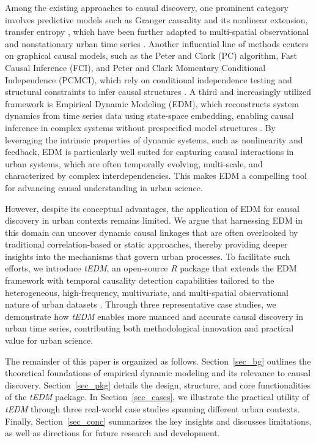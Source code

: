 \documentclass[authoryear,preprint,review,12pt]{elsarticle}
\begin{document}
Among the existing approaches to causal discovery, one prominent category involves predictive models such as Granger causality \citep{granger1969grangertest,geweke1982grangertest2} and its nonlinear extension, transfer entropy \citep{schreiber2000te1,vicente2010te2}, which have been further adapted to multi-spatial observational and nonstationary urban time series \citep{deng2022urban_granger_causality,gan2025urban_transfer_entropy}. Another influential line of methods centers on graphical causal models, such as the Peter and Clark (PC) algorithm, Fast Causal Inference (FCI), and Peter and Clark Momentary Conditional Independence (PCMCI), which rely on conditional independence testing and structural constraints to infer causal structures \citep{spirtes1993pc,runge2019pcmci,runge2023cits}. A third and increasingly utilized framework is Empirical Dynamic Modeling (EDM), which reconstructs system dynamics from time series data using state-space embedding, enabling causal inference in complex systems without prespecified model structures \citep{lorenz1969ssr,Takens1981embedding,Mane1981embedding,sugihara2012ccm}. By leveraging the intrinsic properties of dynamic systems, such as nonlinearity and feedback, EDM is particularly well suited for capturing causal interactions in urban systems, which are often temporally evolving, multi-scale, and characterized by complex interdependencies. This makes EDM a compelling tool for advancing causal understanding in urban science.

However, despite its conceptual advantages, the application of EDM for causal discovery in urban contexts remains limited. We argue that harnessing EDM in this domain can uncover dynamic causal linkages that are often overlooked by traditional correlation-based or static approaches, thereby providing deeper insights into the mechanisms that govern urban processes. To facilitate such efforts, we introduce \textit{tEDM}, an open-source \textit{R} package that extends the EDM framework with temporal causality detection capabilities tailored to the heterogeneous, high-frequency, multivariate, and multi-spatial observational nature of urban datasets \citep{deng2022urban_granger_causality,gan2025urban_transfer_entropy,fekete2025urban_transport}. Through three representative case studies, we demonstrate how \textit{tEDM} enables more nuanced and accurate causal discovery in urban time series, contributing both methodological innovation and practical value for urban science.

The remainder of this paper is organized as follows. Section~\ref{sec_bg} outlines the theoretical foundations of empirical dynamic modeling and its relevance to causal discovery. Section~\ref{sec_pkg} details the design, structure, and core functionalities of the \textit{tEDM} package. In Section~\ref{sec_cases}, we illustrate the practical utility of \textit{tEDM} through three real-world case studies spanning different urban contexts. Finally, Section~\ref{sec_conc} summarizes the key insights and discusses limitations, as well as directions for future research and development.
\end{document}
